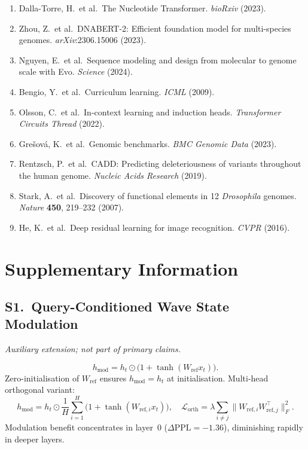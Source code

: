 \documentclass{article}
\begin{document}
\begin{enumerate}
\item Dalla-Torre, H.\ et al.\ The Nucleotide Transformer.
      \textit{bioRxiv} (2023).

\item Zhou, Z.\ et al.\ DNABERT-2: Efficient foundation model for
      multi-species genomes. \textit{arXiv}:2306.15006 (2023).

\item Nguyen, E.\ et al.\ Sequence modeling and design from molecular
      to genome scale with Evo. \textit{Science} (2024).

\item Bengio, Y.\ et al.\ Curriculum learning. \textit{ICML} (2009).

\item Olsson, C.\ et al.\ In-context learning and induction heads.
      \textit{Transformer Circuits Thread} (2022).

\item Gre\v{s}ov\'{a}, K.\ et al.\ Genomic benchmarks.
      \textit{BMC Genomic Data} (2023).

\item Rentzsch, P.\ et al.\ CADD: Predicting deleteriousness of variants
      throughout the human genome.
      \textit{Nucleic Acids Research} (2019).

\item Stark, A.\ et al.\ Discovery of functional elements in 12
      \textit{Drosophila} genomes.
      \textit{Nature} \textbf{450}, 219--232 (2007).

\item He, K.\ et al.\ Deep residual learning for image recognition.
      \textit{CVPR} (2016).

\end{enumerate}

\appendix
\section*{Supplementary Information}

\subsection*{S1.\ Query-Conditioned Wave State Modulation}

\emph{Auxiliary extension; not part of primary claims.}

\begin{equation}
  h_\mathrm{mod} = h_t \odot \bigl(1 + \tanh(W_\mathrm{ref} x_t)\bigr).
\end{equation}
Zero-initialisation of $W_\mathrm{ref}$ ensures $h_\mathrm{mod} = h_t$
at initialisation.
Multi-head orthogonal variant:
\begin{equation}
  h_\mathrm{mod} = h_t \odot \frac{1}{H}
    \sum_{i=1}^{H} \bigl(1 + \tanh(W_{\mathrm{ref},i} x_t)\bigr),\quad
  \mathcal{L}_\mathrm{orth} = \lambda \sum_{i \ne j}
    \|W_{\mathrm{ref},i} W_{\mathrm{ref},j}^\top\|_F^2.
\end{equation}
Modulation benefit concentrates in layer~0 ($\Delta\mathrm{PPL} = -1.36$),
diminishing rapidly in deeper layers.
\end{document}
